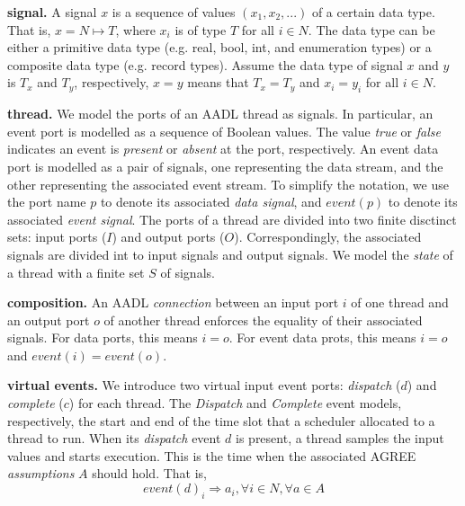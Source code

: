 {\bf signal.}
A signal $x$ is a sequence of values $(x_1, x_2, ...)$ of a certain data type. That is, $x = N \mapsto T$, where $x_i$ is of type $T$ for all $i \in N$. The data type can be either a primitive data type (e.g. real, bool, int, and enumeration types) or a composite data type (e.g. record types). Assume the data type of signal $x$ and $y$ is $T_x$ and $T_y$, respectively, $x = y$ means that $T_x=T_y$ and $x_i = y_i$ for all $i \in N$. 

{\bf thread.}
We model the ports of an AADL thread as signals. In particular, an event port is modelled as a sequence of Boolean values. The value \emph{true} or \emph{false} indicates an event is \emph{present} or \emph{absent} at the port, respectively. An event data port is modelled as a pair of signals, one representing the data stream, and the other representing the associated event stream. To simplify the notation, we use the port name $p$ to denote its associated \emph{data signal}, and $event(p)$ to denote its associated \emph{event signal}. The ports of a thread are divided into two finite disctinct sets: input ports ($I$) and output ports ($O$). Correspondingly, the associated signals are divided int to input signals and output signals. We model the \emph{state} of a thread with a finite set $S$ of signals. %

{\bf composition.}
An AADL \emph{connection} between an input port $i$ of one thread and an output port $o$ of another thread enforces the equality of their associated signals. For data ports, this means $i = o$. For event data prots, this means $i = o$ and $event(i) = event(o)$. %

{\bf virtual events.}
We introduce two virtual input event ports: \emph{dispatch} ($d$) and \emph{complete} ($c$) for each thread.  The \emph{Dispatch} and \emph{Complete} event models, respectively, the start and end of the time slot that a scheduler allocated to a thread to run. 
When its \emph{dispatch} event $d$ is present, a thread samples the input values and starts execution. This is the time when the associated AGREE \emph{assumptions} $A$ should hold. That is,
$$event(d)_i \Rightarrow a_i, \forall i\in N, \forall a \in A $$

